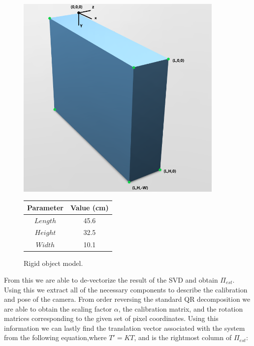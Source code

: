 \documentclass[12pt]{article}
\begin{document}
\begin{figure}[h]
	\centering %
	\captionsetup{justification=centering}
	\begin{minipage}{0.5\textwidth}
		\centering %
		\includegraphics[width=0.9\textwidth]{BoxModel.png}
		\caption{Rigid object model.} \label{box}
	\end{minipage}\hfill
	\begin{minipage}{0.5\textwidth}
		\begin{center}
			\begin{tabular}[5pt]{| c| c|}
				\hline
				Parameter	& Value (cm) \\[0.5ex] 
				\hline 	
				$Length$& 45.6  \\ \hline 
				$Height$& 32.5  \\ \hline 
				$Width$& 10.1  \\ \hline 
			\end{tabular}
			\label{boxdim}
		\end{center}	
	\end{minipage}
\end{figure}

\noindent From this we are able to de-vectorize the result of the SVD and obtain $\Pi_{est}$. Using this we extract all of the necessary components to describe the calibration and pose of the camera. From order reversing the standard QR decomposition we are able to obtain the scaling factor $\alpha$, the calibration matrix, and the rotation matrices corresponding to the given set of pixel coordinates. Using this information we can lastly find the translation vector associated with the system from the following equation,where $T' = KT$, and is the rightmost column of $\Pi_{est}$: 
\end{document}
